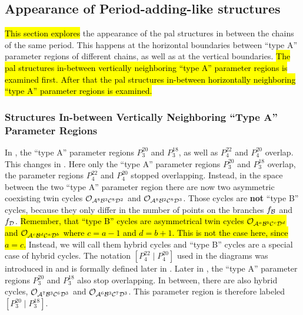 \subsection{Appearance of Period-adding-like structures}
\label{sec:add.change.appa}


\hl{This section explores} the appearance of the \gls{pal} structures in between the chains of the same period.
This happens at the horizontal boundaries between ``type A'' parameter regions of different chains, as well as at the vertical boundaries.
\hl{
	The \gls{pal} structures in-between vertically neighboring ``type A'' parameter regions is examined first.
	After that the \gls{pal} structures in-between horizontally neighboring ``type A'' parameter regions is examined.
}

\subsubsection{ Structures In-between Vertically Neighboring ``Type A'' Parameter Regions}
\label{sec:add.change.appa.hor}

In , the ``type A'' parameter regions $P^{20}_3$ and $P^{18}_3$, as well as $P^{22}_4$ and $P^{20}_4$ overlap.
This changes in .
Here only the ``type A'' parameter regions $P^{20}_3$ and $P^{18}_3$ overlap, the parameter regions $P^{22}_4$ and $P^{20}_4$ stopped overlapping.
Instead, in the space between the two ``type A'' parameter region there are now two asymmetric coexisting twin cycles $\mathcal{O}_{\mathcal{A}^8\mathcal{B}^3\mathcal{C}^8\mathcal{D}^2}$ and $\mathcal{O}_{\mathcal{A}^8\mathcal{B}^2\mathcal{C}^8\mathcal{D}^3}$.
Those cycles are \textbf{not} ``type B'' cycles, because they only differ in the number of points on the branches $f_{\mathcal{B}}$ and $f_{\mathcal{D}}$.
\hl{
	Remember, that ``type B'' cycles are asymmetrical twin cycles $\mathcal{O}_{\mathcal{A}^a\mathcal{B}^b\mathcal{C}^c\mathcal{D}^d}$ and $\mathcal{O}_{\mathcal{A}^c\mathcal{B}^d\mathcal{C}^a\mathcal{D}^b}$ where $c = a - 1$ and $d = b + 1$.
	This is not the case here, since $a = c$.
}
Instead, we will call them hybrid cycles and ``type B'' cycles are a special case of hybrid cycles.
The notation $\left[P^{22}_4 \mid P^{20}_4\right]$ used in the diagrams was introduced in  and is formally defined later in .
Later in , the ``type A'' parameter regions $P^{20}_3$ and $P^{18}_3$ also stop overlapping.
In between, there are also hybrid cycles, $\mathcal{O}_{\mathcal{A}^7\mathcal{B}^3\mathcal{C}^6\mathcal{D}^3}$ and $\mathcal{O}_{\mathcal{A}^6\mathcal{B}^3\mathcal{C}^7\mathcal{D}^3}$.
This parameter region is therefore labeled $\left[P^{20}_3 \mid P^{18}_3\right]$.

